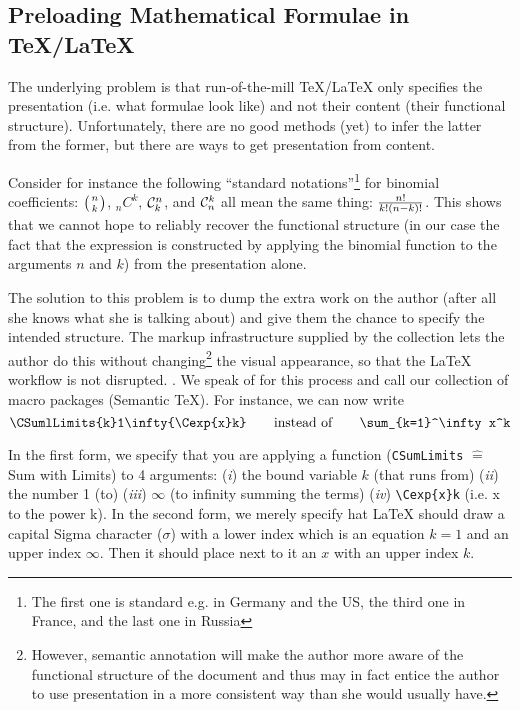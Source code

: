 \subsection{Preloading Mathematical Formulae in {\TeX/\LaTeX}}

The underlying problem is that run-of-the-mill {\TeX/\LaTeX} only specifies the
presentation (i.e. what formulae look like) and not their content (their functional
structure). Unfortunately, there are no good methods (yet) to infer the latter from the
former, but there are ways to get presentation from content.
 
Consider for instance the following ``standard notations''\footnote{The first one is
  standard e.g. in Germany and the US, the third one in France, and the last one in
  Russia} for binomial coefficients: $\left(n\atop k\right)$, $_nC^k$, ${\cal C}^n_k$, and
${\cal C}^k_n$ all mean the same thing: $n!\over k!(n-k)!$. This shows that we cannot hope
to reliably recover the functional structure (in our case the fact that the expression is
constructed by applying the binomial function to the arguments $n$ and $k$) from the
presentation alone.
 
The solution to this problem is to dump the extra work on the author (after all she knows
what she is talking about) and give them the chance to specify the intended structure. The
markup infrastructure supplied by the {\stex} collection lets the author do this without
changing\footnote{However, semantic annotation will make the author more aware of the
  functional structure of the document and thus may in fact entice the author to use
  presentation in a more consistent way than she would usually have.} the visual
appearance, so that the {\LaTeX} workflow is not disrupted. . We speak of
{} for this process and call our collection of macro
packages {\stex} (Semantic {\TeX}). For instance, we can now write
\begin{equation}\label{cmatthml-sum}
  \verb|\CSumlLimits{k}1\infty{\Cexp{x}k}| \qquad\hbox{instead of}\qquad
  \verb|\sum_{k=1}^\infty x^k|
\end{equation}

In the first form, we specify that you are applying a function (\verb|CSumLimits| $\hat=$ Sum
with Limits) to 4 arguments: ({\sl{i}}) the bound variable $k$ (that runs from)
({\sl{ii}}) the number 1 (to) ({\sl{iii}}) $\infty$ (to infinity summing the terms)
({\sl{iv}}) \verb|\Cexp{x}k| (i.e. x to the power k).  In the second form, we merely specify
hat {\LaTeX} should draw a capital Sigma character ($\sigma$) with a lower index which is
an equation $k=1$ and an upper index $\infty$. Then it should place next to it an $x$ with
an upper index $k$.

